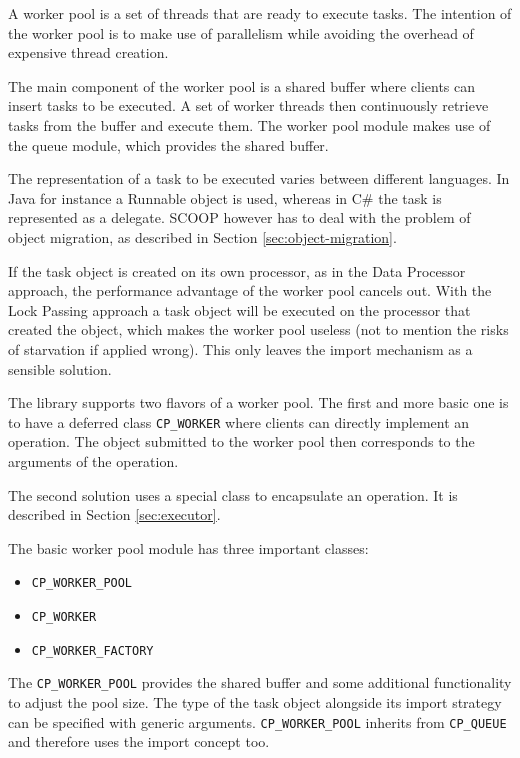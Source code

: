 A worker pool is a set of threads that are ready to execute tasks.
The intention of the worker pool is to make use of parallelism while avoiding the overhead of expensive thread creation.

The main component of the worker pool is a shared buffer where clients can insert tasks to be executed.
A set of worker threads then continuously retrieve tasks from the buffer and execute them.
The worker pool module makes use of the queue module, which provides the shared buffer.

The representation of a task to be executed varies between different languages.
In Java for instance a Runnable object is used, whereas in C\# the task is represented as a delegate.
SCOOP however has to deal with the problem of object migration, as described in Section \ref{sec:object-migration}.

If the task object is created on its own processor, as in the Data Processor approach, the performance advantage of the worker pool cancels out.
With the Lock Passing approach a task object will be executed on the processor that created the object, which makes the worker pool useless (not to mention the risks of starvation if applied wrong).
This only leaves the import mechanism as a sensible solution.

The library supports two flavors of a worker pool.
The first and more basic one is to have a deferred class \lstinline!CP_WORKER! where clients can directly implement an operation.
The object submitted to the worker pool then corresponds to the arguments of the operation.

The second solution uses a special class to encapsulate an operation.
It is described in Section \ref{sec:executor}.

The basic worker pool module has three important classes:
\begin{itemize}
 \item \lstinline!CP_WORKER_POOL!
 \item \lstinline!CP_WORKER!
 \item \lstinline!CP_WORKER_FACTORY!
\end{itemize}

The \lstinline!CP_WORKER_POOL! provides the shared buffer and some additional functionality to adjust the pool size.
The type of the task object alongside its import strategy can be specified with generic arguments.
\lstinline!CP_WORKER_POOL! inherits from \lstinline!CP_QUEUE! and therefore uses the import concept too.

